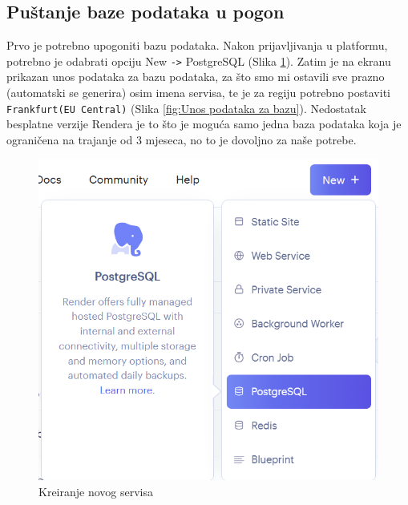 			\subsection{Puštanje baze podataka u pogon} 
			Prvo je potrebno upogoniti bazu podataka. Nakon prijavljivanja u platformu, potrebno je odabrati opciju New \texttt{->} PostgreSQL  (Slika \ref{fig:Kreiranjenovogservisa}). 
			Zatim je na ekranu prikazan unos podataka za bazu podataka, za što smo mi ostavili sve prazno (automatski se generira) osim imena servisa, te je za regiju potrebno postaviti \texttt{Frankfurt(EU Central)} (Slika \ref{fig:Unos podataka za bazu}).
			Nedostatak besplatne verzije Rendera je to što je moguća samo jedna baza podataka koja je ograničena na trajanje od 3 mjeseca, no to je dovoljno za naše potrebe.
			\begin{figure}[H]
				\includegraphics[scale=0.60]{slike/render1.png} %
				\centering
				\caption{Kreiranje novog servisa}
				\label{fig:Kreiranjenovogservisa}
			\end{figure}

